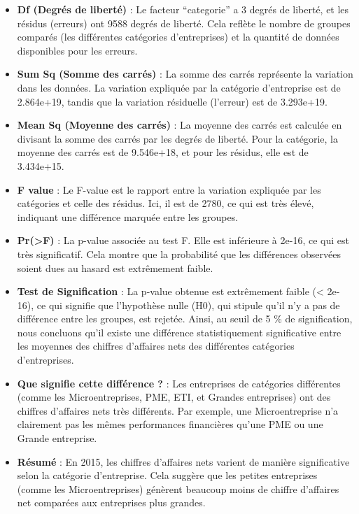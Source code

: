\documentclass[mstat,12pt]{unswthesis}
\begin{document}
\begin{itemize}
\item
  \textbf{Df (Degrés de liberté)} : Le facteur ``categorie'' a 3 degrés
  de liberté, et les résidus (erreurs) ont 9588 degrés de liberté. Cela
  reflète le nombre de groupes comparés (les différentes catégories
  d'entreprises) et la quantité de données disponibles pour les erreurs.
\item
  \textbf{Sum Sq (Somme des carrés)} : La somme des carrés représente la
  variation dans les données. La variation expliquée par la catégorie
  d'entreprise est de 2.864e+19, tandis que la variation résiduelle
  (l'erreur) est de 3.293e+19.
\item
  \textbf{Mean Sq (Moyenne des carrés)} : La moyenne des carrés est
  calculée en divisant la somme des carrés par les degrés de liberté.
  Pour la catégorie, la moyenne des carrés est de 9.546e+18, et pour les
  résidus, elle est de 3.434e+15.
\item
  \textbf{F value} : Le F-value est le rapport entre la variation
  expliquée par les catégories et celle des résidus. Ici, il est de
  2780, ce qui est très élevé, indiquant une différence marquée entre
  les groupes.
\item
  \textbf{Pr(\textgreater F)} : La p-value associée au test F. Elle est
  inférieure à 2e-16, ce qui est très significatif. Cela montre que la
  probabilité que les différences observées soient dues au hasard est
  extrêmement faible.
\item
  \textbf{Test de Signification} : La p-value obtenue est extrêmement
  faible (\textless{} 2e-16), ce qui signifie que l'hypothèse nulle
  (H0), qui stipule qu'il n'y a pas de différence entre les groupes, est
  rejetée. Ainsi, au seuil de 5 \% de signification, nous concluons
  qu'il existe une différence statistiquement significative entre les
  moyennes des chiffres d'affaires nets des différentes catégories
  d'entreprises.
\item
  \textbf{Que signifie cette différence ?} : Les entreprises de
  catégories différentes (comme les Microentreprises, PME, ETI, et
  Grandes entreprises) ont des chiffres d'affaires nets très différents.
  Par exemple, une Microentreprise n'a clairement pas les mêmes
  performances financières qu'une PME ou une Grande entreprise.
\item
  \textbf{Résumé} : En 2015, les chiffres d'affaires nets varient de
  manière significative selon la catégorie d'entreprise. Cela suggère
  que les petites entreprises (comme les Microentreprises) génèrent
  beaucoup moins de chiffre d'affaires net comparées aux entreprises
  plus grandes.
\end{itemize}
\end{document}
